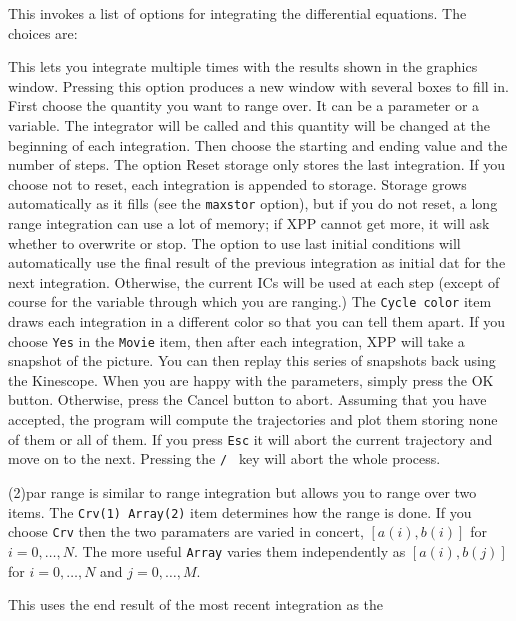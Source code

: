 \documentclass{article}
\newcommand{\tc}[1]{\addcontentsline{toc}{subsection}{#1}}
\begin{document}
\begin{description}

\tc{ICs}\item[(I)nitial conds] This invokes a list of options for integrating the
 differential equations.  The choices are:
\begin{description}
\item[(R)ange]  This lets you integrate multiple times with the results shown
 in the graphics window.  Pressing this option produces a new window with
 several boxes to fill in.  First choose the quantity you want to range
 over.  It can be a parameter or a variable.  The integrator will be called
 and this quantity will be changed at the beginning of each integration.
  Then choose the starting and ending value and the number of steps. The
 option Reset storage only stores the last integration.  If you choose not
 to reset, each integration is appended to storage.  Storage grows automatically as it fills
 (see the {\tt maxstor} option), but if you do not reset, a long range integration can use a lot of memory; if XPP cannot get more, it will ask
 whether to overwrite or stop. The option 
to use last initial conditions will automatically use the final result of
 the previous integration as initial dat for the next integration.  Otherwise,
 the current ICs will be used at each step (except of course for the  variable
 through which you are ranging.) 
The {\tt Cycle color} item draws each integration in a different color so that you can tell them apart.
If you choose {\tt Yes} in the {\tt Movie} item,
then after each integration, XPP will take a snapshot of the picture.
You can then replay this series of snapshots back using the Kinescope.
When you are happy with the parameters, simply
 press the OK button.  Otherwise, press the Cancel button to abort.  Assuming
 that you have accepted, the program will compute the trajectories and plot 
them storing none of them or all of them.  If you press {\tt Esc} it will abort the 
current trajectory and move on to the next.  Pressing the {\tt / } key will abort
 the whole process. 
\item{(2)par range} is similar to range integration but allows you to
range over two items. The {\tt Crv(1) Array(2)} item determines how
the range is done. If you choose {\tt Crv} then the two paramaters are
varied in concert, $[a(i),b(i)]$ for $i=0,\ldots,N$. The more useful
{\tt Array} varies them independently as $[a(i),b(j)]$ for
$i=0,\ldots,N$ and $j=0,\ldots,M.$    
\item[(L)ast]  This uses the end result of the most recent integration as the

\end{description}
\end{description}
\end{document}

